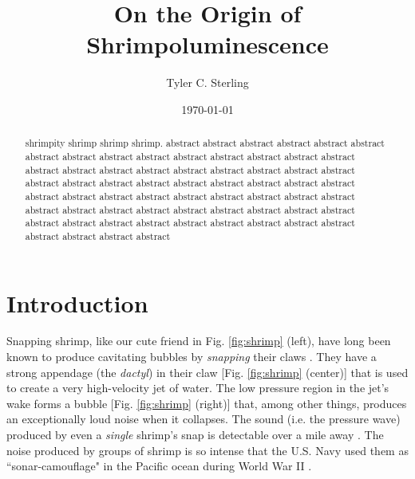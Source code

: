 \documentclass[rmp,aps,nofootinbib,superscriptaddress,floatfix]{revtex4-2}
\begin{document}
\title{On the Origin of Shrimpoluminescence}

\author{Tyler C. Sterling}

\date{\today}

\begin{abstract}
shrimpity shrimp shrimp shrimp. abstract abstract abstract abstract abstract abstract abstract abstract abstract abstract abstract abstract abstract abstract abstract abstract abstract abstract abstract abstract abstract abstract abstract abstract abstract abstract abstract abstract abstract abstract abstract abstract abstract abstract abstract abstract abstract abstract abstract abstract abstract abstract abstract abstract abstract abstract abstract abstract abstract abstract abstract abstract abstract abstract abstract abstract abstract abstract abstract abstract abstract abstract abstract abstract 
\end{abstract}

\maketitle





\section{Introduction}
Snapping shrimp, like our cute friend in Fig. \ref{fig:shrimp} (left), have long been known to produce cavitating bubbles by \emph{snapping} their claws \cite{versluis2000snapping,lohse2001snapping,tang2019bioinspired}. They have a strong appendage (the \emph{dactyl}) in their claw [Fig. \ref{fig:shrimp} (center)] that is used to create a very high-velocity jet of water. The low pressure region in the jet's wake forms a bubble [Fig. \ref{fig:shrimp} (right)] that, among other things, produces an exceptionally loud noise when it collapses. The sound (i.e. the pressure wave) produced by even a \emph{single} shrimp's snap is detectable over a mile away \cite{everest1948acoustical}. The noise produced by groups of shrimp is so intense that the U.S. Navy used them as ``sonar-camouflage" in the Pacific ocean during World War II \cite{versluis2000snapping}. 
\end{document}
